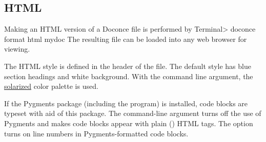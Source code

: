 \documentclass[twoside]{book}
\begin{document}
\subsection{HTML}

Making an HTML version of a Doconce file 
is performed by
\bsys
Terminal> doconce format html mydoc
\esys
The resulting file  can be loaded into any web browser for viewing.

The HTML style is defined in the header of the file. The default style
has blue section headings and white background. With the 
command line argument, the \href{{http://ethanschoonover.com/solarized}}{solarized}
color palette is used.

If the Pygments package (including the  program)
is installed, code blocks are typeset with
aid of this package. The command-line argument 
turns off the use of Pygments and makes code blocks appear with
plain () HTML tags. The option  turns
on line numbers in Pygments-formatted code blocks.
\end{document}
